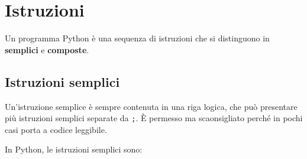 \documentclass[
  letterpaper,
]{scrbook}
\begin{document}
\section{Istruzioni}\label{istruzioni}

Un programma Python è una sequenza di istruzioni che si distinguono in
\textbf{semplici} e \textbf{composte}.

\subsection{Istruzioni semplici}\label{istruzioni-semplici-1}

Un'istruzione semplice è sempre contenuta in una riga logica, che può
presentare più istruzioni semplici separate da \texttt{;}. È permesso ma
scaonsigliato perché in pochi casi porta a codice leggibile.

In Python, le istruzioni semplici sono:
\end{document}
